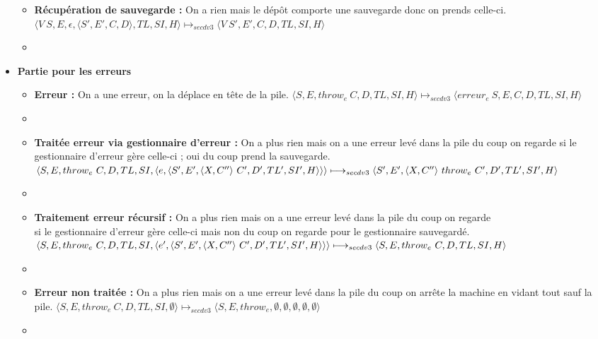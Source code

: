 \documentclass[10pt,a4paper]{article}
\begin{document}
\begin{itemize}
\begin{itemize}
						\item[] \textbf{Récupération de sauvegarde :}  On a rien mais le dépôt comporte une sauvegarde donc on prends celle-ci.
						\smallbreak 
						$\langle V~S,E,\epsilon,\langle S',E',C,D\rangle,TL,SI,H\rangle \longmapsto_{secdv3} \langle V~S',E',C,D,TL,SI,H\rangle$
						\item[]
					\end{itemize}
					\item[] \textbf{Partie pour les erreurs}
					\begin{itemize}
						\item[] \textbf{Erreur :} On a une erreur, on la déplace en tête de la pile.
						\smallbreak
						$\langle S,E,throw_{e}~C,D,TL,SI,H\rangle \longmapsto_{secdv3} \langle erreur_{e}~S,E,C,D,TL,SI,H\rangle$	
						\item[]
						
						\item[] \textbf{Traitée erreur via gestionnaire d'erreur :} On a plus rien mais on a une erreur levé dans la pile du coup on regarde si le gestionnaire d'erreur gère celle-ci ; oui du coup prend la sauvegarde.
						\smallbreak 
						$\langle S,E,throw_{e}~C,D,TL,SI,\langle e,\langle S',E',\langle X,C''\rangle~C',D',TL',SI',H\rangle\rangle\rangle 
						\\\longmapsto_{secdv3} \langle S',E',\langle X,C''\rangle~throw_{e}~C',D',TL',SI',H\rangle$
						\item[]
						
						\item[]  \textbf{Traitement erreur récursif :} On a plus rien mais on a une erreur levé dans la pile du coup on regarde 
						\\si le gestionnaire d'erreur gère celle-ci mais non du coup on regarde pour le gestionnaire sauvegardé.
						\smallbreak 
						$\langle S,E,throw_{e}~C,D,TL,SI,\langle e',\langle S',E',\langle X,C''\rangle~C',D',TL',SI',H\rangle\rangle\rangle 
						\\\longmapsto_{secdv3} \langle S,E,throw_{e}~C,D,TL,SI,H \rangle$
						\item[]
						
						\item[]  \textbf{Erreur non traitée :} On a plus rien mais on a une erreur levé dans la pile du coup on arrête la machine en vidant tout sauf la pile.
						\smallbreak 
						$\langle S,E,throw_{e}~C,D,TL,SI,\emptyset\rangle \longmapsto_{secdv3} \langle S,E,throw_{e},\emptyset,\emptyset,\emptyset,\emptyset,\emptyset\rangle$  
						\item[]
						

\end{itemize}
\end{itemize}
\end{document}
